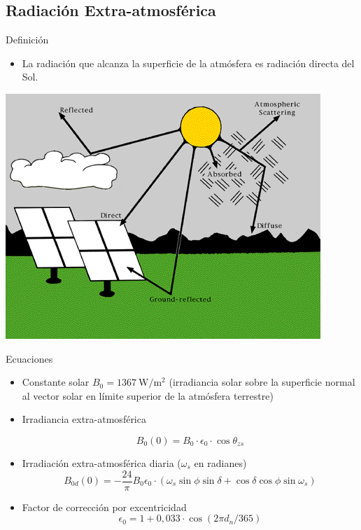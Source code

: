 \documentclass[xcolor={usenames,svgnames,dvipsnames}]{beamer}
\begin{document}
\subsection{Radiación Extra-atmosférica}
\label{sec:org1565185}


\begin{frame}[label={sec:org0fa8352}]{Definición}
\begin{itemize}
\item La radiación que alcanza la superficie de la atmósfera es radiación
directa del Sol.
\end{itemize}

\begin{center}
\includegraphics[height=0.5\textheight]{../figs/SolarRadiationComponents_NREL.png}
\end{center}
\end{frame}


\begin{frame}[label={sec:orgb90ecd9}]{Ecuaciones}
\begin{itemize}
\item \alert{Constante solar} \(B_{0}=\SI{1367}{\watt\per\meter\squared}\)
(irradiancia solar sobre la superficie normal al vector solar en límite superior de la atmósfera terrestre)

\item \alert{Irradiancia extra-atmosférica}

\[B_{0}(0)=B_{0}\cdot\epsilon_{0}\cdot\cos\theta_{zs}\]

\item \alert{Irradiación extra-atmosférica diaria}  (\(\omega_{s}\) en radianes)
\[
  B_{0d}(0)=-\frac{24}{\pi}B_{0}\epsilon_{0}\cdot\left(\omega_{s}\sin\phi\sin\delta+\cos\delta\cos\phi\sin\omega_{s}\right)
\]

\item Factor de corrección por excentricidad
\[\epsilon_0 = 1+0,033\cdot\cos(2\pi d_n/365)\]
\end{itemize}
\end{frame}
\end{document}
